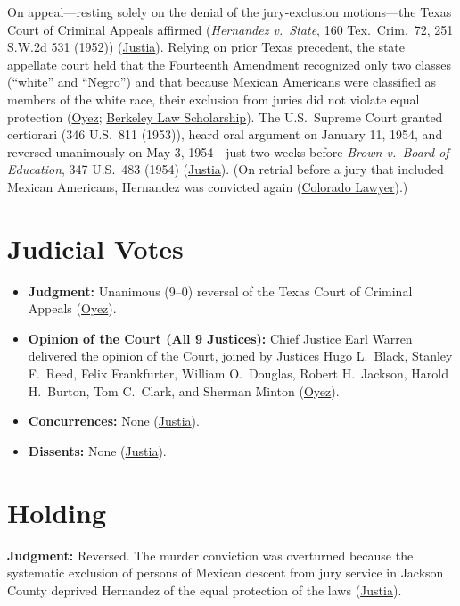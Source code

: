 \documentclass[12pt]{article}
\begin{document}
On appeal---resting solely on the denial of the jury-exclusion motions---the Texas Court of Criminal Appeals affirmed (\textit{Hernandez v.\ State}, 160 Tex.\ Crim.\ 72, 251 S.W.2d 531 (1952)) (\href{https://supreme.justia.com/cases/federal/us/347/475/}{Justia}). Relying on prior Texas precedent, the state appellate court held that the Fourteenth Amendment recognized only two classes (``white'' and ``Negro'') and that because Mexican Americans were classified as members of the white race, their exclusion from juries did not violate equal protection (\href{https://www.oyez.org/cases/1940-1955/347us475}{Oyez}; \href{https://lawcat.berkeley.edu/record/1116057/files/fulltext.pdf}{Berkeley Law Scholarship}). The U.S.\ Supreme Court granted certiorari (346 U.S.\ 811 (1953)), heard oral argument on January 11, 1954, and reversed unanimously on May 3, 1954---just two weeks before \textit{Brown v.\ Board of Education}, 347 U.S.\ 483 (1954) (\href{https://supreme.justia.com/cases/federal/us/347/475/}{Justia}). (On retrial before a jury that included Mexican Americans, Hernandez was convicted again (\href{https://cl.cobar.org/departments/latinos-in-the-courtroom/}{Colorado Lawyer}).)

\section{Judicial Votes}
\begin{itemize}
\item \textbf{Judgment:} Unanimous (9--0) reversal of the Texas Court of Criminal Appeals (\href{https://www.oyez.org/cases/1940-1955/347us475}{Oyez}).
\item \textbf{Opinion of the Court (All 9 Justices):} Chief Justice Earl Warren delivered the opinion of the Court, joined by Justices Hugo L.\ Black, Stanley F.\ Reed, Felix Frankfurter, William O.\ Douglas, Robert H.\ Jackson, Harold H.\ Burton, Tom C.\ Clark, and Sherman Minton (\href{https://www.oyez.org/cases/1940-1955/347us475}{Oyez}).
\item \textbf{Concurrences:} None (\href{https://supreme.justia.com/cases/federal/us/347/475/}{Justia}).
\item \textbf{Dissents:} None (\href{https://supreme.justia.com/cases/federal/us/347/475/}{Justia}).
\end{itemize}

\section{Holding}
\textbf{Judgment:} Reversed. The murder conviction was overturned because the systematic exclusion of persons of Mexican descent from jury service in Jackson County deprived Hernandez of the equal protection of the laws (\href{https://supreme.justia.com/cases/federal/us/347/475/}{Justia}).
\end{document}
